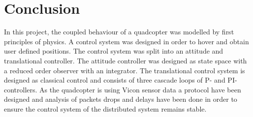 \section{Conclusion}
In this project, the coupled behaviour of a quadcopter was modelled by first principles of physics. A control system was designed in order to hover and obtain user defined positions.
The control system was split into an attitude and translational controller. The attitude controller was designed as state space with a reduced order observer with an integrator. The translational control system is designed as classical control and consists of three cascade loops of P- and PI- controllers. 
As the quadcopter is using Vicon sensor data a protocol have been designed and analysis of packets drops and delays have been done in order to ensure the control system of the distributed system remains stable.
